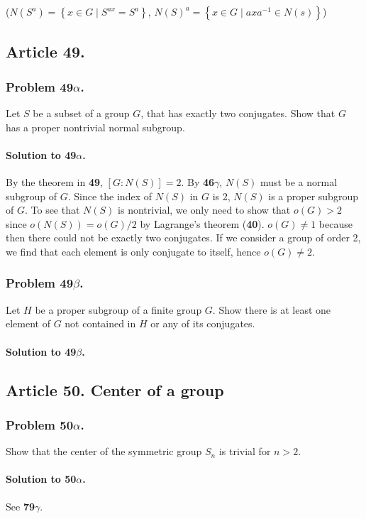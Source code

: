 ($N(S^a) = \left\{ x \in G \mid S^{ax} = S^a \right\}$,
$N(S)^a = \left\{ x \in G \mid axa^{-1} \in N(s) \right\}$)

\subsection{Article 49.}
\subsubsection{Problem 49$\alpha$.}
Let $S$ be a subset of a group $G$, that has exactly two conjugates. Show that
$G$ has a proper nontrivial normal subgroup.

\paragraph*{Solution to 49$\alpha$.}
By the theorem in \textbf{49}, $[G : N(S)] = 2$. By \textbf{46$\gamma$}, $N(S)$
must be a normal subgroup of $G$. Since the index of $N(S)$ in $G$ is 2, $N(S)$ is a
proper subgroup of $G$. To see that $N(S)$ is nontrivial, we only need to show
that $o(G) > 2$ since $o(N(S)) = o(G)/2$ by Lagrange's theorem (\textbf{40}).
$o(G) \neq 1$ because then there could not be exactly two conjugates. If we
consider a group of order 2, we find that each element is only conjugate to
itself, hence $o(G) \neq 2$.

\subsubsection{Problem 49$\beta$.}
Let $H$ be a proper subgroup of a finite group $G$. Show there is at least
one element of $G$ not contained in $H$ or any of its conjugates.

\paragraph*{Solution to 49$\beta$.}

\subsection{Article 50. Center of a group}
\subsubsection{Problem 50$\alpha$.}
Show that the center of the symmetric group $S_n$ is trivial for $n > 2$.

\paragraph*{Solution to 50$\alpha$.}
See \textbf{79$\gamma$}.

